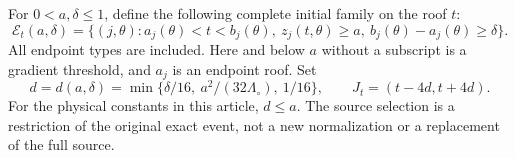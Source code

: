 For $0<a,\delta\le1$, define the following complete initial family
on the roof $t$:
\begin{equation}\label{eq:v87-initial-family}
 \mathcal E_t(a,\delta)=
 \{(j,\theta):a_j(\theta)<t<b_j(\theta),\
                  z_j(t,\theta)\ge a,\ b_j(\theta)-a_j(\theta)\ge\delta\}.
\end{equation}
All endpoint types are included. Here and below $a$ without a subscript
is a gradient threshold, and $a_j$ is an endpoint roof. Set
\begin{equation}\label{eq:v87-trace-width}
 d=d(a,\delta)=\min\{\delta/16,\ a^2/(32\Lambda_\circ),\ 1/16\},
 \qquad J_t=(t-4d,t+4d).
\end{equation}
For the physical constants in this article, $d\le a$. The source
selection is a restriction of the original exact event, not a new
normalization or a replacement of the full source.

